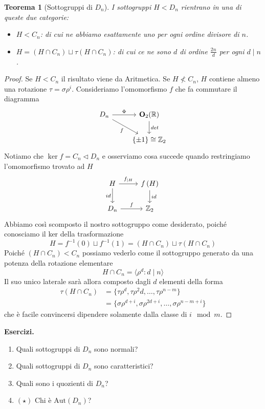 \documentclass[a4paper]{article}
\newtheorem{theorem}{Teorema}[section]
\theoremstyle{remark}
\theoremstyle{definition}
\newcommand{\Aut}[1]{\mathrm{Aut}\left( #1 \right)}
\begin{document}
\begin{multicols}{2}
\begin{theorem}[Sottogruppi di $ D_n $]
	I sottogruppi $ H < D_n $ rientrano in una di queste due categorie:
	\begin{itemize}
		\item $ H < C_n $: di cui ne abbiamo esattamente uno per ogni ordine divisore di $ n $.
		\item $ H = (H \cap C_n) \sqcup \tau(H\cap C_n) $: di cui ce ne sono $ d $ di ordine $ \frac{2n}{d} $ per ogni $ d \mid n $.
	\end{itemize}
\end{theorem}
\begin{proof}
	Se $ H < C_n $ il risultato viene da Aritmetica. Se $ H \nless C_n $, $ H $ contiene almeno una rotazione $ \tau = \sigma\rho^i $. Consideriamo l'omomorfismo $ f $ che fa commutare il diagramma
	\[ \begin{tikzcd}
	D_n \arrow{r}{\Phi} \arrow[swap]{dr}{f} & \mathbf{O}_2(\mathbb{R}) \arrow{d}{det} \\
	& \{\pm 1\} \cong \mathbb{Z}_2	\end{tikzcd}
	\]
	Notiamo che $ \ker f = C_n \lhd D_n $ e osserviamo cosa succede quando restringiamo l'omomorfismo trovato ad $ H $
	\[ \begin{tikzcd}
	H \arrow{r}{f_{|H}} \arrow[swap]{d}{id} & f\left(H\right) \arrow{d}{id} \\
	D_n \arrow{r}{f} & \mathbb{Z}_2
	\end{tikzcd}
	\]
	Abbiamo così scomposto il nostro sottogruppo come desiderato, poiché conosciamo il ker della trasformazione
	\[ H = f^{-1}(0) \sqcup f^{-1}(1) = (H \cap C_n) \sqcup \tau (H\cap C_n) \]
	Poiché $ (H \cap C_n) < C_n $ possiamo vederlo come il sottogruppo generato da una potenza della rotazione elementare \[ H \cap C_n = \langle \rho^d \colon d \mid n \rangle \] Il suo unico laterale sarà allora composto dagli $ d $ elementi della forma  \begin{align*}\tau(H\cap C_n) &=  \{\tau\rho^d, \tau\rho^2d, \dots, \tau\rho^{n-m} \} \\ &= \{\sigma\rho^{d+i}, \sigma\rho^{2d+i}, \dots, \sigma\rho^{n-m +i} \}\end{align*}  che è facile convincersi dipendere solamente dalla classe di $ i \mod m $.
\end{proof}

\textbf{Esercizi.}
\begin{enumerate}
	\item Quali sottogruppi di $ D_n $ sono normali?
	\item Quali sottogruppi di $ D_n $ sono caratteristici?
	\item Quali sono i quozienti di $ D_n $?
	\item $ (\star) $ Chi è $ \Aut{D_n} $?
\end{enumerate}

\end{multicols}
\end{document}
